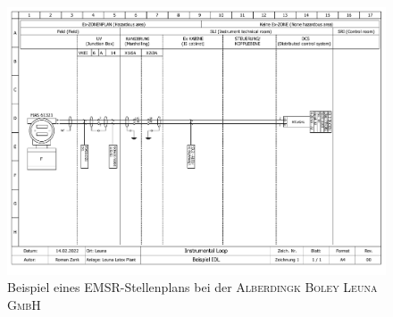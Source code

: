 \begin{figure}[h!]
	\centering
	\includegraphics[width=1.0\textwidth]{cad/vorlage_idl.pdf}
	\caption{Beispiel eines EMSR-Stellenplans bei der \textsc{Alberdingk Boley Leuna GmbH}}
	\label{fig:idl}
\end{figure}
\FloatBarrier

